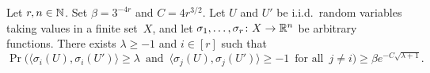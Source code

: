 
\begin{lemma}
  \label{lem:geometric} %
  Let \(r, n\in\mathbb{N}\). Set \(\beta = 3^{-4r}\) and \(C = 4r^{3/2}\).
  Let \(U\) and \(U'\) be i.i.d.~random variables taking values in a finite set~\(X\), and let \(\sigma_1,\ldots,\sigma_r \colon X \rightarrow \mathbb{R}^n\) be arbitrary functions. There exists \(\lambda\ge-1\) and \(i\in[r]\) such that
  \begin{equation*}
    \Pr\Big( \big\langle \sigma_i(U),\sigma_i(U') \big\rangle \ge \lambda \, \text{ and } \, \big\langle \sigma_j(U), \sigma_j(U') \big\rangle \ge -1 \, \text{ for all } \, j \ne i \Big) \ge \beta e^{- C\sqrt{\lambda + 1}}.
  \end{equation*}
\end{lemma}

